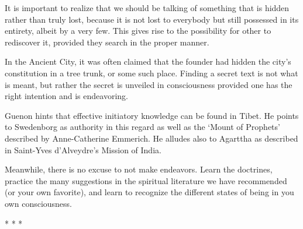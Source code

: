 \begin{quotex}
It is important to realize that we should be talking of something that is hidden rather than truly lost, because it is not lost to everybody but still possessed in its entirety, albeit by a very few. This gives rise to the possibility for other to rediscover it, provided they search in the proper manner. 

\end{quotex}
In the Ancient City, it was often claimed that the founder had hidden the city's constitution in a tree trunk, or some such place. Finding a secret text is not what is meant, but rather the secret is unveiled in consciousness provided one has the right intention and is endeavoring.

Guenon hints that effective initiatory knowledge can be found in Tibet. He points to Swedenborg as authority in this regard as well as the `Mount of Prophets' described by Anne-Catherine Emmerich. He alludes also to Agarttha as described in Saint-Yves d'Alveydre's Mission of India.

Meanwhile, there is no excuse to not make endeavors. Learn the doctrines, practice the many suggestions in the spiritual literature we have recommended (or your own favorite), and learn to recognize the different states of being in you own consciousness.




\begin{center}* * *\end{center}

